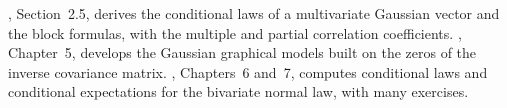 
\furtherreading
\textcite{anderson-multivariate}, Section~2.5, derives the conditional laws of a multivariate Gaussian
vector and the block formulas, with the multiple and partial correlation coefficients.
\textcite{lauritzen-graphical}, Chapter~5, develops the Gaussian graphical models built on the zeros of
the inverse covariance matrix. \textcite{ross-5}, Chapters~6 and~7, computes conditional laws and
conditional expectations for the bivariate normal law, with many exercises.

